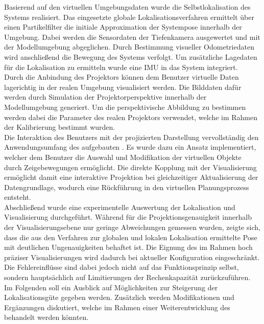 Basierend auf den virtuellen Umgebungsdaten wurde die Selbstlokalisation des Systems realisiert. Das eingesetzte globale Lokalisationsverfahren ermittelt über einen Partikelfilter die initiale Approximation der Systempose innerhalb der Umgebung. Dabei werden die Sensordaten der Tiefenkamera ausgewertet und mit der Modellumgebung abgeglichen. Durch Bestimmung visueller Odometriedaten wird anschließend die Bewegung des Systems verfolgt. Um zusätzliche Lagedaten für die Lokalisation zu ermitteln wurde eine IMU in das System integriert.\\

Durch die Anbindung des Projektors können dem Benutzer virtuelle Daten lagerichtig in der realen Umgebung visualisiert werden. Die Bilddaten dafür werden durch Simulation der Projektorperspektive innerhalb der Modellumgebung generiert. Um die perspektivische Abbildung zu bestimmen werden dabei die Parameter des realen Projektors verwendet, welche im Rahmen der Kalibrierung bestimmt wurden.\\

Die Interaktion des Benutzers mit der projizierten Darstellung vervollständig den Anwendungsumfang des aufgebauten . Es wurde dazu ein Ansatz implementiert, welcher dem Benutzer die Auswahl und Modifikation der virtuellen Objekte durch Zeigebewegungen ermöglicht. Die direkte Kopplung mit der Visualisierung ermöglicht damit eine interaktive Projektion bei gleichzeitiger Aktualisierung der Datengrundlage, wodurch eine Rückführung in den virtuellen Planungsprozess entsteht.\\

Abschließend wurde eine experimentelle Auswertung der Lokalisation und Visualisierung durchgeführt. Während für die Projektionsgenauigkeit innerhalb der Visualisierungsebene nur geringe Abweichungen gemessen wurden, zeigte sich, dass die aus den Verfahren zur globalen und lokalen Lokalisation ermittelte Pose mit deutlichen Ungenauigkeiten behaftet ist. Die Eignung des  im Rahmen hoch präziser Visualisierungen wird dadurch bei aktueller Konfiguration eingeschränkt. Die Fehlereinflüsse sind dabei jedoch nicht auf das Funktionsprinzip selbst, sondern hauptsächlich auf Limitierungen der Rechenkapazität zurückzuführen.\\

Im Folgenden soll ein Ausblick auf Möglichkeiten zur Steigerung der Lokalisationsgüte gegeben werden. Zusätzlich werden Modifikationen und Ergänzungen diskutiert, welche im Rahmen einer Weiterentwicklung des  behandelt werden könnten.\\

